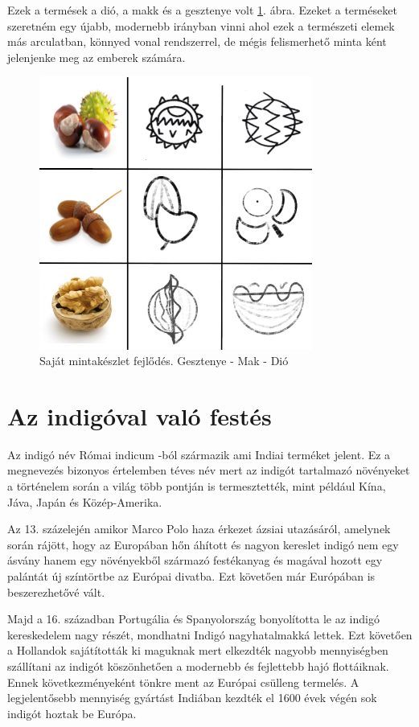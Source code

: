 \documentclass[fontsize=12pt, appendixprefix=true]{scrreprt}
\begin{document}
Ezek a termések a dió, a makk és a gesztenye volt \ref{fig:sajat1}. ábra.
Ezeket a terméseket szeretném egy újabb, modernebb irányban vinni ahol ezek a természeti elemek más arculatban, könnyed vonal rendszerrel, de mégis felismerhető minta ként jelenjenke meg az emberek számára.

\begin{figure}[h!]
	\centering
	\includegraphics[width=0.8\textwidth]{img/sajat01.jpg}
	\caption{Saját mintakészlet fejlődés. Gesztenye - Mak - Dió}
	\label{fig:sajat1}
\end{figure}

\chapter{Az indigóval való festés}
Az indigó név Római indicum -ból származik ami Indiai terméket jelent.
Ez a megnevezés bizonyos értelemben téves név mert az indigót tartalmazó növényeket a történelem során a világ több pontján is termesztették, mint például Kína, Jáva, Japán és Közép-Amerika.  

Az 13. százelején amikor Marco Polo haza érkezet ázsiai utazásáról, amelynek során rájött, hogy az Europában hőn áhított és nagyon kereslet indigó nem egy ásvány hanem egy növényekből származó festékanyag és magával hozott egy palántát új színtörtbe az Európai divatba. Ezt követően már Európában is beszerezhetővé vált.

Majd a 16. században Portugália és Spanyolország bonyolította le az indigó kereskedelem nagy részét, mondhatni Indigó nagyhatalmakká lettek.
Ezt követően a Hollandok sajátították ki maguknak mert elkezdték nagyobb mennyiségben szállítani az indigót köszönhetően a modernebb és fejlettebb hajó flottáiknak. Ennek következményeként tönkre ment az Európai csülleng termelés. A legjelentősebb mennyiség gyártást Indiában kezdték el 1600 évek végén sok indigót hoztak be Európa.
 
\end{document}

